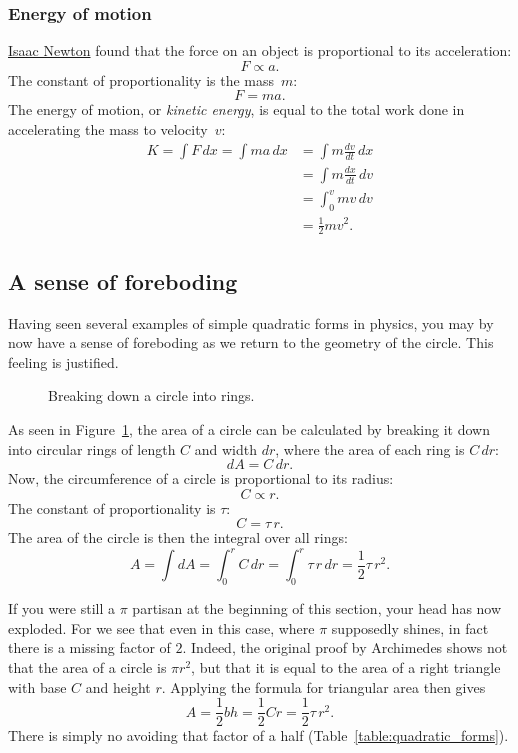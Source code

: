     \subsubsection{Energy of motion} %
    \label{sec:energy_of_motion}

\href{https://en.wikipedia.org/wiki/Isaac_Newton}{Isaac Newton} found that the force on an object is proportional to its acceleration:
\[ F \propto a. \]
The constant of proportionality is the mass~$m$:
\[ F = m a. \]
The energy of motion, or \emph{kinetic energy}, is equal to the total work done in accelerating the mass to velocity~$v$:
\[
\begin{split}
K = \int F\,dx = \int ma\,dx & = \int m\frac{dv}{dt}\,dx \\ & = \int m\frac{dx}{dt}\,dv \\ & = \int_0^v mv\,dv \\ & = \textstyle{\frac{1}{2}} mv^2.
\end{split}
\]

  \subsection{A sense of foreboding} %
  \label{sec:a_sense_of_foreboding}

Having seen several examples of simple quadratic forms in physics, you may by now have a sense of foreboding as we return to the geometry of the circle. This feeling is justified.

\begin{figure}
\begin{center}
\end{center}
\caption{Breaking down a circle into rings.\label{fig:circular_area}}
\end{figure}


As seen in Figure~\ref{fig:circular_area}, the area of a circle can be calculated by breaking it down into circular rings of length $C$ and width $dr$, where the area of each ring is $C\,dr$:
\[ dA = C\,dr. \]
Now, the circumference of a circle is proportional to its radius:
\[ C \propto r. \]
The constant of proportionality is $\tau$:
\[ C = \tau\,r. \]
The area of the circle is then the integral over all rings:
\[ A = \int dA = \int_0^r C\,dr = \int_0^r \tau\,r\,dr = \textstyle{\frac{1}{2}} \tau\,r^2. \]

If you were still a $\pi$ partisan at the beginning of this section, your head has now exploded. For we see that even in this case, where $\pi$ supposedly shines, in fact there is a missing factor of $2$. Indeed, the original proof by Archimedes shows not that the area  of a circle is $\pi r^2$, but that it is equal to the area of a right triangle with base $C$ and height $r$. Applying the formula for triangular area then gives
\[
  A = \textstyle{\frac{1}{2}} bh = \textstyle{\frac{1}{2}}Cr = \textstyle{\frac{1}{2}}\tau\,r^2.
\]
There is simply no avoiding that factor of a half (Table~\ref{table:quadratic_forms}).

